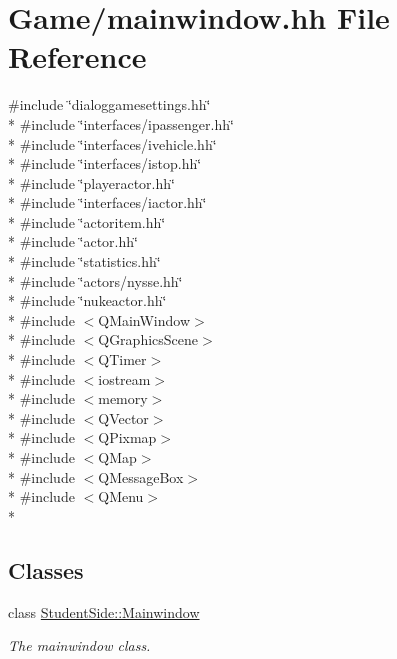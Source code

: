 \hypertarget{mainwindow_8hh}{\section{Game/mainwindow.hh File Reference}
\label{mainwindow_8hh}
}
{\ttfamily \#include \char`\"{}dialoggamesettings.\-hh\char`\"{}}\\*
{\ttfamily \#include \char`\"{}interfaces/ipassenger.\-hh\char`\"{}}\\*
{\ttfamily \#include \char`\"{}interfaces/ivehicle.\-hh\char`\"{}}\\*
{\ttfamily \#include \char`\"{}interfaces/istop.\-hh\char`\"{}}\\*
{\ttfamily \#include \char`\"{}playeractor.\-hh\char`\"{}}\\*
{\ttfamily \#include \char`\"{}interfaces/iactor.\-hh\char`\"{}}\\*
{\ttfamily \#include \char`\"{}actoritem.\-hh\char`\"{}}\\*
{\ttfamily \#include \char`\"{}actor.\-hh\char`\"{}}\\*
{\ttfamily \#include \char`\"{}statistics.\-hh\char`\"{}}\\*
{\ttfamily \#include \char`\"{}actors/nysse.\-hh\char`\"{}}\\*
{\ttfamily \#include \char`\"{}nukeactor.\-hh\char`\"{}}\\*
{\ttfamily \#include $<$Q\-Main\-Window$>$}\\*
{\ttfamily \#include $<$Q\-Graphics\-Scene$>$}\\*
{\ttfamily \#include $<$Q\-Timer$>$}\\*
{\ttfamily \#include $<$iostream$>$}\\*
{\ttfamily \#include $<$memory$>$}\\*
{\ttfamily \#include $<$Q\-Vector$>$}\\*
{\ttfamily \#include $<$Q\-Pixmap$>$}\\*
{\ttfamily \#include $<$Q\-Map$>$}\\*
{\ttfamily \#include $<$Q\-Message\-Box$>$}\\*
{\ttfamily \#include $<$Q\-Menu$>$}\\*
\subsection*{Classes}
\begin{DoxyCompactItemize}
\item 
class \hyperlink{class_student_side_1_1_mainwindow}{Student\-Side\-::\-Mainwindow}
\begin{DoxyCompactList}\small\item\em The mainwindow class. \end{DoxyCompactList}\end{DoxyCompactItemize}
